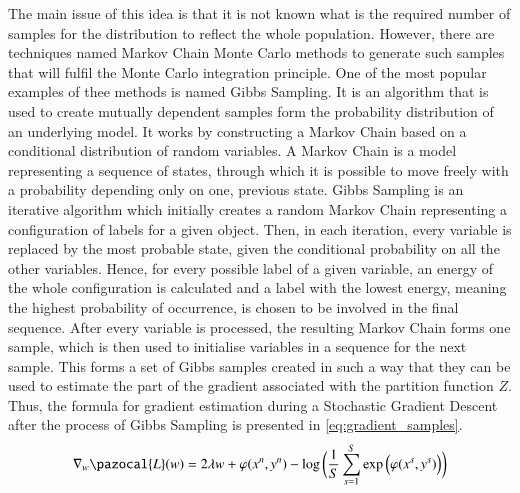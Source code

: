 The main issue of this idea is that it is not known what is the required number of samples for the distribution to reflect the whole population. However, there are techniques named Markov Chain Monte Carlo methods to generate such samples that will fulfil the Monte Carlo integration principle. One of the most popular examples of thee methods is named Gibbs Sampling. It is an algorithm that is used to create mutually dependent samples form the probability distribution of an underlying model. It works by constructing a Markov Chain based on a conditional distribution of random variables. A Markov Chain is a model representing a sequence of states, through which it is possible to move freely with a probability depending only on one, previous state. Gibbs Sampling is an iterative algorithm which initially creates a random Markov Chain representing a configuration of labels for a given object. Then, in each iteration, every variable is replaced by the most probable state, given the conditional probability on all the other variables. Hence, for every possible label of a given variable, an energy of the whole configuration is calculated and a label with the lowest energy, meaning the highest probability of occurrence, is chosen to be involved in the final sequence. After every variable is processed, the resulting Markov Chain forms one sample, which is then used to initialise variables in a sequence for the next sample. This forms a set of Gibbs samples created in such a way that they can be used to estimate the part of the gradient associated with the partition function $Z$. Thus, the formula for gradient estimation during a Stochastic Gradient Descent after the process of Gibbs Sampling is presented in \ref{eq:gradient_samples}.
\begin{equation}
    \label{eq:gradient_samples}
    \nabla_w\pazocal{L}(w) = 2\lambda w + 
    \varphi(x^n,y^n) -
    \log{ \bigg(
        \frac{1}{S} \sum_{s = 1}^{S}{\exp \Big( \varphi(x^s,y^{s}) \Big) } \bigg)}
\end{equation}

